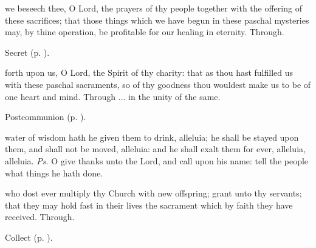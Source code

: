 
\secret
{} we beseech thee, O Lord, the prayers of thy people together with the offering of these sacrifices; that those things which we have begun in these paschal mysteries may, by thine operation, be profitable for our healing in eternity. Through.
\begin{rubric}
     Secret  (p. \pageref{EasterSecret}).
\end{rubric}


\postcommunion
{} forth upon us, O Lord, the Spirit of thy charity: that as thou hast fulfilled us with these paschal sacraments, so of thy goodness thou wouldest make us to be of one heart and mind. Through ... in the unity of the same.

\begin{rubric}
     Postcommunion  (p. \pageref{EasterPostcommunion}).
\end{rubric}

\clearpage
{}

\introit
{} water of wisdom hath he given them to drink, alleluia; he shall be stayed upon them, and shall not be moved, alleluia: and he shall exalt them for ever, alleluia, alleluia. \textit{Ps.} O give thanks unto the Lord, and call upon his name: tell the people what things he hath done.

\collect
 who dost ever multiply thy Church with new offspring; grant unto thy servants; that they may hold fast in their lives the sacrament which by faith they have received. Through.
\begin{rubric}
     Collect  (p. \pageref{EasterCollect}).
\end{rubric}

